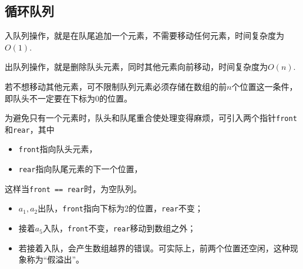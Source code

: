 \subsection{循环队列}

\begin{frame}\ft{\subsecname}

\end{frame}

\begin{frame}\ft{\subsecname}
\begin{zhu}
入队列操作，就是在队尾追加一个元素，不需要移动任何元素，时间复杂度为$O(1)$.
\end{zhu}
\end{frame}
%
\begin{frame}\ft{\subsecname}

\end{frame}
%
\begin{frame}\ft{\subsecname}
\begin{zhu}
出队列操作，就是删除队头元素，同时其他元素向前移动，时间复杂度为$O(n)$.
\end{zhu}
\end{frame}

\begin{frame}\ft{\subsecname}
若不想移动其他元素，可不限制队列元素必须存储在数组的前$n$个位置这一条件，即队头不一定要在下标为0的位置。
\end{frame}

\begin{frame}\ft{\subsecname}
  
\end{frame}

\begin{frame}\ft{\subsecname}
为避免只有一个元素时，队头和队尾重合使处理变得麻烦，可引入两个指针{\tt front}和{\tt rear}，其中
\begin{itemize}
\item {\tt front}指向队头元素，\\[0.1in]
\item {\tt rear}指向队尾元素的下一个位置，\\[0.1in]
\end{itemize}
这样当{\tt front == rear}时，为空队列。
\end{frame}
%
\begin{frame}\ft{\subsecname}
  
\end{frame}
%
\begin{frame}\ft{\subsecname}

\pause

\begin{itemize}
\item $a_1, a_2$出队，{\tt front}指向下标为2的位置，{\tt rear}不变；\\[0.1in]
\item 接着$a_5$入队，{\tt front}不变，{\tt rear}移动到数组之外；\\[0.1in]
\item 若接着入队，会产生数组越界的错误。可实际上，前两个位置还空闲，这种现象称为“假溢出”。
\end{itemize}
\end{frame}
%

